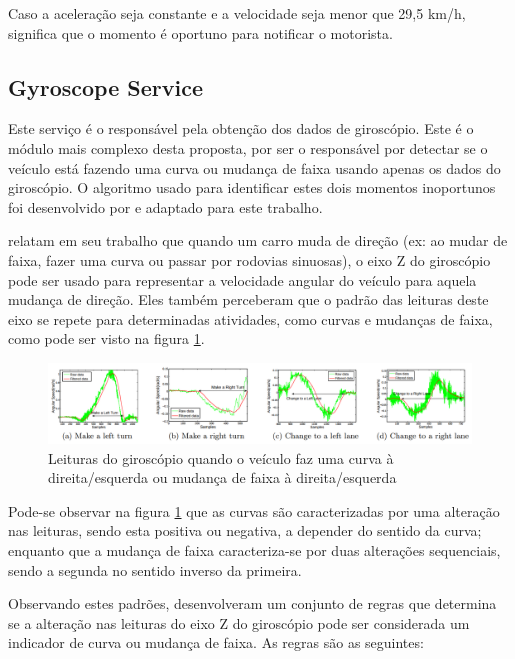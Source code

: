 Caso a aceleração seja constante e a velocidade seja menor que 29,5 km/h, significa que o momento é oportuno para notificar o motorista.

\subsection{Gyroscope Service}
\label{gyroscope-service}

Este serviço é o responsável pela obtenção dos dados de giroscópio. Este é o módulo mais complexo desta proposta, por ser o responsável por
detectar se o veículo está fazendo uma curva ou mudança de faixa usando apenas os dados do giroscópio. O algoritmo usado para identificar
estes dois momentos inoportunos foi desenvolvido por  e adaptado para este trabalho.

 relatam em seu trabalho que quando um carro muda de direção (ex: ao mudar de faixa, fazer uma curva ou passar
por rodovias sinuosas), o eixo Z do giroscópio pode ser usado para representar a velocidade angular do veículo para aquela mudança de direção.
Eles também perceberam que o padrão das leituras deste eixo se repete para determinadas atividades, como curvas e mudanças de faixa, como pode
ser visto na figura \ref{leituras-giroscopio}.

\begin{figure}[h]
\centering
\includegraphics[width=1\textwidth]{images/leituras-giroscopio.png}
\caption{Leituras do giroscópio quando o veículo faz uma curva à direita/esquerda ou mudança de faixa à direita/esquerda \cite{chen2015invisible}}
\label{leituras-giroscopio}
\end{figure}

Pode-se observar na figura \ref{leituras-giroscopio} que as curvas são caracterizadas por uma alteração nas leituras, sendo esta positiva ou negativa,
a depender do sentido da curva; enquanto que a mudança de faixa caracteriza-se por duas alterações sequenciais, sendo a segunda no sentido inverso
da primeira.

Observando estes padrões,  desenvolveram um conjunto de regras que determina se a alteração nas leituras do eixo Z do
giroscópio pode ser considerada um indicador de curva ou mudança de faixa. As regras são as seguintes:

